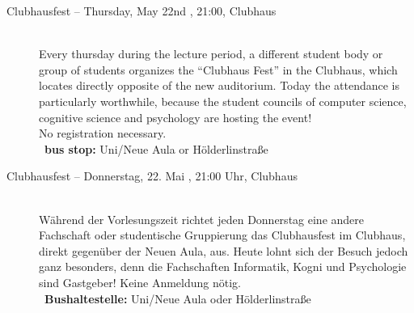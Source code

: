 \begin{description}
\ifmaster \iflehramt \pagebreak \fi \fi


\ifml
    \item[Clubhausfest -- Thursday, May 22nd \YEAR, 21:00, Clubhaus]\ \\
    Every thursday during the lecture period, a different student body or group of students organizes the "`Clubhaus Fest"' in
    the Clubhaus, which locates directly opposite of the new auditorium. Today the attendance is particularly worthwhile, because
    the student councils of computer science, cognitive science and psychology are hosting the event! \\
    No registration necessary.\\
    ~\textbf{bus stop:} Uni/Neue Aula or Hölderlinstraße
\else
    \item[Clubhausfest -- Donnerstag, 22. Mai \YEAR, 21:00 Uhr, Clubhaus]\ \\
    Während der Vorlesungszeit richtet jeden Donnerstag eine andere Fachschaft oder studentische Gruppierung das Clubhausfest
    im Clubhaus, direkt gegenüber der Neuen Aula, aus. Heute lohnt sich der Besuch jedoch ganz besonders, denn die Fachschaften
    Informatik, Kogni und Psychologie sind Gastgeber!  %
    Keine Anmeldung nötig.\\ 
    ~\textbf{Bushaltestelle:} Uni/Neue Aula oder Hölderlinstraße
\fi


\end{description}
